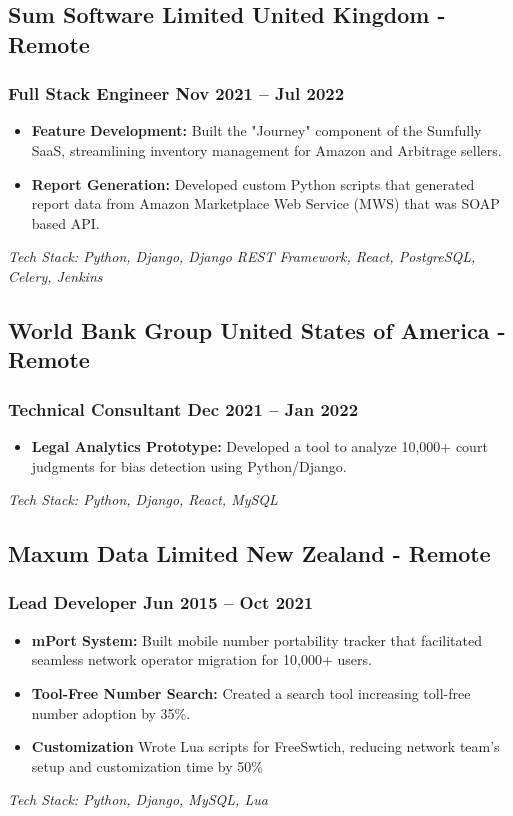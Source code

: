 \documentclass[11pt]{article} %
\newcommand \techstack [1]
    {\small\textit{Tech Stack: {#1}}} %
\begin{document}
\subsection{Sum Software Limited \hfill United Kingdom - Remote}
\subsubsection{Full Stack Engineer \hfill  Nov 2021 -- Jul 2022}
\begin{itemize}
    \item \textbf{Feature Development:} Built the "Journey" component of the Sumfully SaaS, streamlining inventory management for Amazon and Arbitrage sellers.
    \item \textbf{Report Generation:} Developed custom Python scripts that generated report data from Amazon Marketplace Web Service (MWS) that was SOAP based API.
\end{itemize}
\techstack{Python, Django, Django REST Framework, React, PostgreSQL, Celery, Jenkins}
\vspace{0.8em}

\subsection{World Bank Group \hfill United States of America - Remote}
\subsubsection{Technical Consultant \hfill  Dec 2021 -- Jan 2022}
\begin{itemize}
    \item \textbf{Legal Analytics Prototype:} Developed a tool to analyze 10,000+ court judgments for bias detection using Python/Django.
\end{itemize}
\techstack{Python, Django, React, MySQL}
\vspace{0.8em}

\subsection{Maxum Data Limited \hfill New Zealand - Remote}
\subsubsection{Lead Developer \hfill  Jun 2015 -- Oct 2021}
\begin{itemize}
    \item \textbf{mPort System:} Built mobile number portability tracker that facilitated seamless network operator migration for 10,000+ users.
    \item \textbf{Tool-Free Number Search: } Created a search tool increasing toll-free number adoption by 35\%.
    \item \textbf{Customization} Wrote Lua scripts for FreeSwtich, reducing network team's setup and customization time by 50\%
\end{itemize}
\techstack{Python, Django, MySQL, Lua}
\vspace{0.8em}
\end{document}
